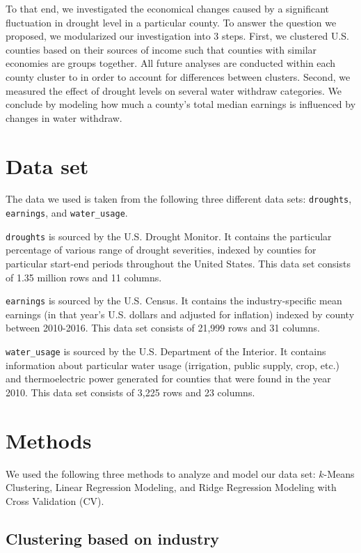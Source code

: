 \documentclass{article}
\begin{document}
To that end, we investigated the economical changes caused by a significant fluctuation in drought level 
in a particular county. To answer the question we proposed, we modularized our investigation into 3 steps. First, we clustered U.S. counties based on their 
sources of income such that counties with similar economies are groups together. All future analyses are conducted within each county cluster to in order to account for differences between clusters. Second, we measured the effect of drought levels on several water withdraw categories. We conclude by modeling how much 
a county's total median earnings is influenced by changes in water withdraw. 


\section{Data set}
The data we used is taken from the following three different data sets: \texttt{droughts}, \texttt{earnings}, and \texttt{water\_usage}.

\texttt{droughts} is sourced by the U.S. Drought Monitor. It contains the particular percentage of various range of drought severities, indexed by counties for particular start-end periods throughout the United States. This data set consists of 1.35 million rows and 11 columns.

\texttt{earnings} is sourced by the U.S. Census. It contains the industry-specific mean earnings (in that year's U.S. dollars and adjusted for inflation) indexed by county between 2010-2016. This data set consists of 21,999 rows and 31 columns.

\texttt{water\_usage} is sourced by the U.S. Department of the Interior. It contains information about particular water usage (irrigation, public supply, crop, etc.) and thermoelectric power generated for counties that were found in the year 2010.  This data set consists of 3,225 rows and 23 columns.

\section{Methods}
We used the following three methods to analyze and model our data set: $k$-Means Clustering, Linear Regression Modeling, and Ridge Regression Modeling with Cross Validation (CV).

\subsection{Clustering based on industry}
\end{document}
